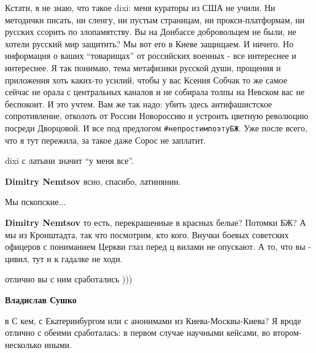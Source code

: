\begin{itemize}
\begin{itemize}

Кстати, я не знаю, что такое dixi: меня кураторы из США не учили. Ни методички
писать, ни сленгу, ни пустым страницам, ни прокси-платформам, ни русских
ссорить по злопамятству. Вы на Донбассе добровольцем не были, не хотели русский
мир защитить? Мы вот его в Киеве защищаем. И ничего. Но информация о ваших
\enquote{товарищах} от российских военных - все интереснее и интереснее. Я так понимаю,
тема метафизики русской души, прощения и приложения хоть каких-то усилий, чтобы
у вас Ксения Собчак то же самое сейчас не орала с центральных каналов и не
собирала толпы на Невском вас не беспокоит. И это учтем. Вам же так надо: убить
здесь антифашистское сопротивление, отколоть от России Новороссию и устроить
цветную революцию посреди Дворцовой. И все под предлогом \verb|#непростимпоэтуБЖ|. Уже
после всего, что я тут пережила, за такое даже Сорос не заплатит.

dixi с латыни значит \enquote{у меня все}.

\textbf{Dimitry Nemtsov} ясно, спасибо, латинянин.

Мы пскопские...

\textbf{Dimitry Nemtsov} то есть, перекрашенные в красных белые? Потомки БЖ? А мы из Кронштадта, так что посмотрим, кто кого. Внучки боевых советских офицеров с пониманием Церкви глаз перед ц вилами не опускают. А то, что вы - цивил, тут и к гадалке не ходи.

\end{itemize}


отлично вы с ним сработались )))

\begin{itemize}
\textbf{Владислав Сушко}

в С кем, с Екатеринбургом или с анонимами из Киева-Москвы-Киева? Я вроде
отлично с обеими сработалась: в первом случае научными кейсами, во втором-
несколько иными.




\end{itemize}
\end{itemize}
